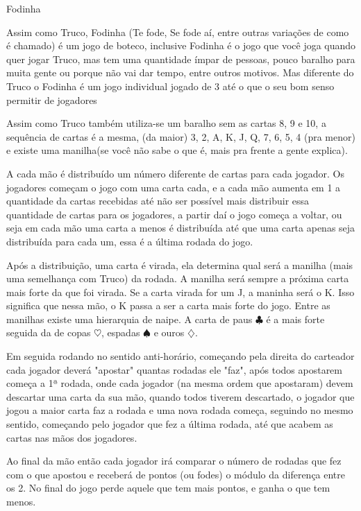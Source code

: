 \begin{subsecao}{Fodinha}

Assim como Truco, Fodinha (Te fode, Se fode aí, entre outras variações de como é chamado) é um jogo de boteco, inclusive Fodinha é o jogo
que você joga quando quer jogar Truco, mas tem uma quantidade ímpar de 
pessoas, pouco baralho para muita gente ou porque não vai dar tempo, entre outros motivos. Mas
diferente do Truco o Fodinha é um jogo individual jogado de 3 até o que o seu bom senso permitir de jogadores

Assim como Truco também utiliza-se um baralho sem as cartas 8, 9 e 10, a sequência
de cartas é a mesma, (da maior) 3, 2, A, K, J, Q, 7, 6, 5, 4 (pra menor)
e existe uma manilha(se você não sabe o que é, mais pra frente a gente explica).

A cada mão é distribuído um número diferente de cartas para cada jogador. Os
jogadores começam o jogo com uma carta cada, e a cada mão aumenta em 1 a
quantidade da cartas recebidas até não ser possível mais distribuir essa quantidade de cartas para os jogadores, a partir daí 
o jogo começa a voltar, ou seja em cada mão uma carta a menos é distribuída até que uma carta apenas seja distribuída para 
cada um, essa é a última rodada do jogo. 

Após a distribuição, uma carta é virada, ela determina qual será a 
manilha (mais uma semelhança com Truco) da rodada. A manilha será sempre a próxima carta mais forte da que foi virada.
Se a carta virada for um J, a maninha será o K. Isso significa que nessa mão, o
K passa a ser a carta mais forte do jogo. Entre as manilhas existe uma
hierarquia de naipe. A carta de paus $\clubsuit$  é a mais forte seguida da de copas $\heartsuit$,
espadas $\spadesuit$ e ouros $\diamondsuit$.

Em seguida rodando no sentido anti-horário, começando pela direita do carteador cada jogador deverá "apostar" 
quantas rodadas ele "faz", após todos apostarem começa a 1ª rodada, onde cada jogador (na mesma ordem que apostaram) 
devem descartar uma carta da sua mão, quando todos tiverem descartado, o jogador que jogou a maior carta faz a rodada 
e uma nova rodada começa, seguindo no mesmo sentido, começando pelo jogador que fez a última rodada, até que acabem
as cartas nas mãos dos jogadores.

Ao final da mão então cada jogador irá comparar o número de rodadas que fez com o que apostou e receberá de pontos (ou fodes) 
o módulo da diferença entre os 2. No final do jogo perde aquele que tem mais pontos, e ganha o que tem menos.


\end{subsecao}
